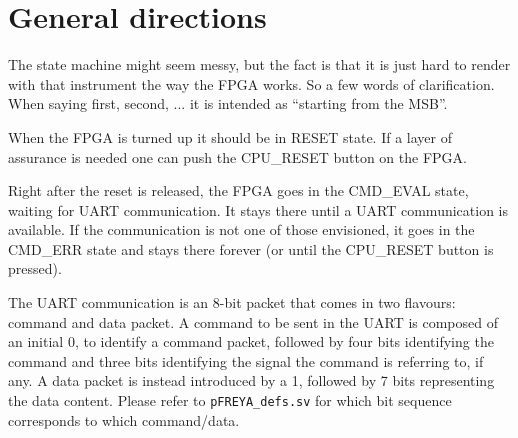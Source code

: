 \documentclass[a4paper,twoside]{article}
\begin{document}
\begin{figure}[h]
{
		}
	\end{figure}

	\section{General directions}
	The state machine might seem messy, but the fact is that it is just hard to render with that instrument the way the FPGA works. So a few words of clarification. When saying first, second, ... it is intended as ``starting from the MSB''.

	When the FPGA is turned up it should be in RESET state. If a layer of assurance is needed one can push the CPU\_RESET button on the FPGA.

	Right after the reset is released, the FPGA goes in the CMD\_EVAL state, waiting for UART communication. It stays there until a UART communication is available. If the communication is not one of those envisioned, it goes in the CMD\_ERR state and stays there forever (or until the CPU\_RESET button is pressed).

	The UART communication is an 8-bit packet that comes in two flavours: command and data packet. A command to be sent in the UART is composed of an initial 0, to identify a command packet, followed by four bits identifying the command and three bits identifying the signal the command is referring to, if any. A data packet is instead introduced by a 1, followed by 7 bits representing the data content. Please refer to \texttt{pFREYA\_defs.sv} for which bit sequence corresponds to which command/data.
\end{document}
